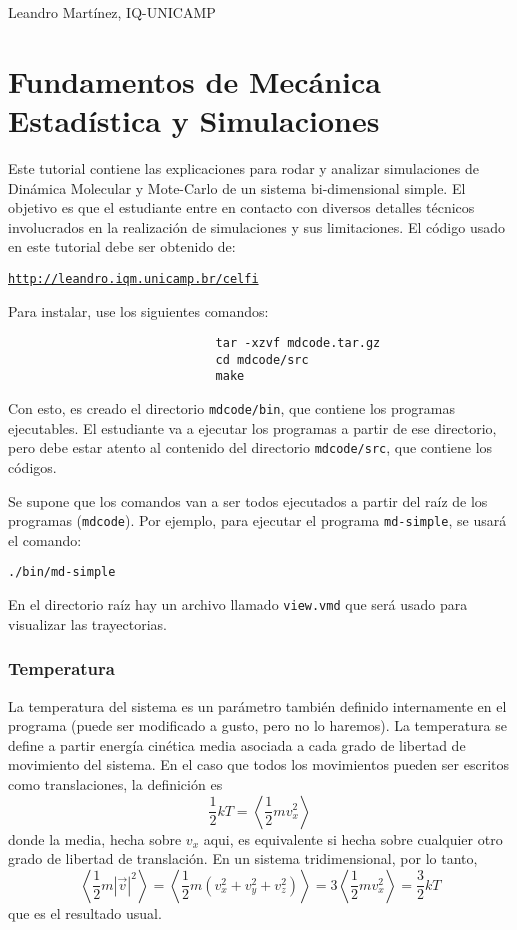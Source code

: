 \documentclass[10pt,a4paper,ssfamily]{exam}
\newcommand{\1}{{\bf 1}}
\newcommand{\2}{{\bf 2}}
\newcommand{\3}{{\bf 3}}
\newcommand{\command}[1]{\begin{center}{\tt #1}\end{center}}
\begin{document}
\pagestyle{empty}
\sffamily
\noindent

\noindent
Leandro Martínez, IQ-UNICAMP

\section{Fundamentos de Mecánica Estadística y Simulaciones}

Este tutorial contiene las explicaciones para rodar y analizar
simulaciones de Dinámica Molecular y Mote-Carlo de un sistema
bi-dimensional simple. El objetivo es que el estudiante entre en
contacto con diversos detalles técnicos involucrados en la realización
de simulaciones y sus limitaciones. El código usado en este tutorial
debe ser obtenido de:
\begin{center}
\href{http://leandro.iqm.unicamp.br/celfi}{{\tt http://leandro.iqm.unicamp.br/celfi}}
\end{center}
Para instalar, use los siguientes comandos:
\begin{verbatim}
                             tar -xzvf mdcode.tar.gz 
                             cd mdcode/src
                             make
\end{verbatim}
Con esto, es creado el directorio {\tt mdcode/bin}, que contiene los
programas ejecutables. El estudiante va a ejecutar los programas a
partir de ese directorio, pero debe estar atento al contenido del
directorio {\tt mdcode/src}, que contiene los códigos. 

Se supone que los comandos van a ser todos ejecutados a partir del 
raíz de los programas ({\tt mdcode}). Por ejemplo, para ejecutar el
programa {\tt md-simple}, se usará el comando:
\command{./bin/md-simple}

En el directorio raíz hay un archivo llamado {\tt view.vmd} que será
usado para visualizar las trayectorias. 

\subsubsection*{Temperatura}

La temperatura del sistema es un parámetro también definido internamente
en el programa (puede ser modificado a gusto, pero no lo haremos). La
temperatura se define a partir energía cinética media asociada a cada
grado de libertad de movimiento del sistema. En el caso que todos los
movimientos pueden ser escritos como translaciones, la definición es
\[
\frac{1}{2}kT = \left< \frac{1}{2} m v_x^2\right>
\]
donde la media, hecha sobre $v_x$ aqui, es equivalente si hecha sobre
cualquier otro grado de libertad de translación. En un sistema
tridimensional, por lo tanto, 
\[
\left<\frac{1}{2}m |\vec{v}|^2 \right> = 
\left<\frac{1}{2}m \left(v_x^2 + v_y^2 + v_z^2\right) \right> = 
3\left< \frac{1}{2} m v_x^2 \right> = \frac{3}{2}kT
\]
que es el resultado usual.
\end{document}
